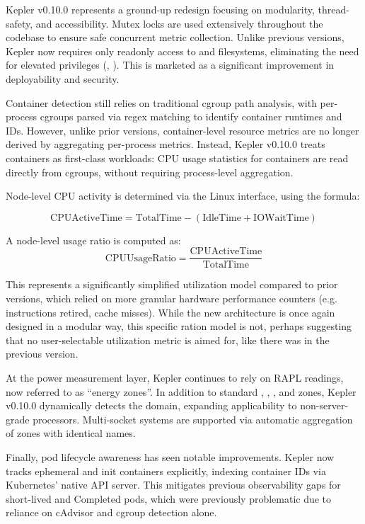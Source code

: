 Kepler v0.10.0 represents a ground-up redesign focusing on modularity, thread-safety, and accessibility. Mutex locks are used extensively throughout the codebase to ensure safe concurrent metric collection. Unlike previous versions, Kepler now requires only readonly access to  and  filesystems, eliminating the need for elevated privileges (, ). This is marketed as a significant improvement in deployability and security.

Container detection still relies on traditional cgroup path analysis, with per-process cgroups parsed via regex matching to identify container runtimes and IDs. However, unlike prior versions, container-level resource metrics are no longer derived by aggregating per-process metrics. Instead, Kepler v0.10.0 treats containers as first-class workloads: CPU usage statistics for containers are read directly from cgroups, without requiring process-level aggregation.

Node-level CPU activity is determined via the Linux  interface, using the formula:

\begin{equation}
\text{CPUActiveTime} = \text{TotalTime} - (\text{IdleTime} + \text{IOWaitTime})
\end{equation}

A node-level usage ratio is computed as:
\begin{equation}
\text{CPUUsageRatio} = \frac{\text{CPUActiveTime}}{\text{TotalTime}}
\end{equation}

This represents a significantly simplified utilization model compared to prior versions, which relied on more granular hardware performance counters (e.g. instructions retired, cache misses). While the new architecture is once again designed in a modular way, this specific ration model is not, perhaps suggesting that no user-selectable utilization metric is aimed for, like there was in the previous version.

At the power measurement layer, Kepler continues to rely on RAPL readings, now referred to as ``energy zones''. In addition to standard , , , and  zones, Kepler v0.10.0 dynamically detects the  domain, expanding applicability to non-server-grade processors. Multi-socket systems are supported via automatic aggregation of zones with identical names.

Finally, pod lifecycle awareness has seen notable improvements. Kepler now tracks ephemeral and init containers explicitly, indexing container IDs via Kubernetes' native API server. This mitigates previous observability gaps for short-lived and Completed pods, which were previously problematic due to reliance on cAdvisor and cgroup detection alone.

